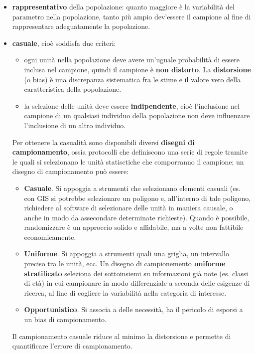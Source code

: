 \documentclass[10pt, draft]{book}
\newcommand{\tightlist}{%
\setlength{\itemsep}{1pt}\setlength{\parskip}{0pt}\setlength{\parsep}{0pt}}
\begin{document}
\begin{itemize} \tightlist
    \item \textbf{rappresentativo} della popolazione: quanto maggiore è la variabilità del parametro nella popolazione, tanto più ampio dev'essere il campione al fine di rappresentare adeguatamente la popolazione.
    \item \textbf{casuale}, cioè soddisfa due criteri:
    \begin{itemize} \tightlist
        \item ogni unità nella popolazione deve avere un'uguale probabilità di essere inclusa nel campione, quindi il campione è \textbf{non distorto}.
        La \textbf{distorsione} (o bias) è una discrepanza sistematica fra le stime e il valore vero della caratteristica della popolazione.
        \item la selezione delle unità deve essere \textbf{indipendente}, cioè l'inclusione nel campione di un qualsiasi individuo della popolazione non deve influenzare l'inclusione di un altro individuo.
    \end{itemize}
    Per ottenere la casualità sono disponibili diversi \textbf{disegni di campionamento}, ossia protocolli che definiscono una serie di regole tramite le quali si selezionano le unità statisctiche che comporranno il campione; un disegno di campionamento può essere:
    \begin{itemize} \tightlist
        \item \textbf{Casuale}. Si appoggia a strumenti che selezionano elementi casuali (es. con GIS si potrebbe selezionare un poligono e, all'interno di tale poligono, richiedere al software di selezionare delle unità in maniera causale, o anche in modo da assecondare determinate richieste). Quando è possibile, randomizzare è un approccio solido e affidabile, ma a volte non fattibile economicamente.
        \item \textbf{Uniforme}. Si appoggia a strumenti quali una griglia, un intervallo preciso tra le unità, ecc. Un disegno di campionemento \textbf{uniforme stratificato} seleziona dei sottoinsiemi su informazioni già note (es. classi di età) in cui campionare in modo differenziale a seconda delle esigenze di ricerca, al fine di cogliere la variabilità nella categoria di interesse.
        \item \textbf{Opportunistico}. Si associa a delle necessità, ha il pericolo di esporsi a un bias di campionamento.
    \end{itemize}
    Il campionamento casuale riduce al minimo la distorsione e permette di quantificare l'errore di campionamento.
\end{itemize}
\end{document}
